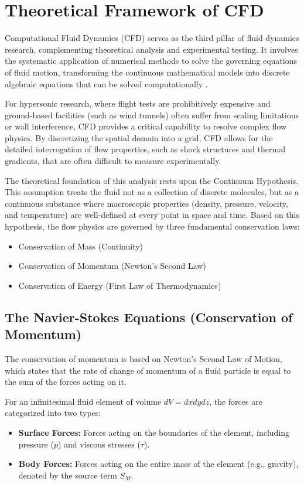 \section{Theoretical Framework of CFD}
\label{sec:cfd_framework}
Computational Fluid Dynamics (CFD) serves as the third pillar of fluid dynamics research, complementing theoretical analysis and experimental testing. It involves the systematic application of numerical methods to solve the governing equations of fluid motion, transforming the continuous mathematical models into discrete algebraic equations that can be solved computationally \cite{versteeg2007cfd}.
\par
For hypersonic research, where flight tests are prohibitively expensive and ground-based facilities (such as wind tunnels) often suffer from scaling limitations or wall interference, CFD provides a critical capability to resolve complex flow physics. By discretizing the spatial domain into a grid, CFD allows for the detailed interrogation of flow properties, such as shock structures and thermal gradients, that are often difficult to measure experimentally.
\par
The theoretical foundation of this analysis rests upon the Continuum Hypothesis. This assumption treats the fluid not as a collection of discrete molecules, but as a continuous substance where macroscopic properties (density, pressure, velocity, and temperature) are well-defined at every point in space and time. Based on this hypothesis, the flow physics are governed by three fundamental conservation laws:
\begin{itemize}
    \item Conservation of Mass (Continuity)
    \item Conservation of Momentum (Newton's Second Law)
    \item Conservation of Energy (First Law of Thermodynamics)
\end{itemize}

\subsection{The Navier-Stokes Equations (Conservation of Momentum)}

The conservation of momentum is based on Newton's Second Law of Motion, which states that the rate of change of momentum of a fluid particle is equal to the sum of the forces acting on it.
\par
For an infinitesimal fluid element of volume $dV = dx dy dz$, the forces are categorized into two types:
\begin{itemize}
    \item \textbf{Surface Forces:} Forces acting on the boundaries of the element, including pressure ($p$) and viscous stresses ($\tau$).
    \item \textbf{Body Forces:} Forces acting on the entire mass of the element (e.g., gravity), denoted by the source term $S_M$.
\end{itemize}

